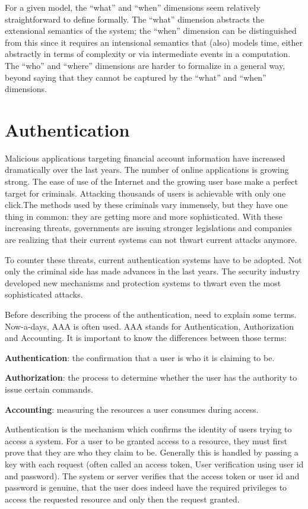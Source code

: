 For a given model, the \enquote{what} and \enquote{when} dimensions seem relatively straightforward to define formally. The \enquote{what} dimension abstracts the extensional semantics
of the system; the \enquote{when} dimension can be distinguished from this since it requires an intensional semantics that (also) models time, either abstractly in terms of complexity
or via intermediate events in a computation. The \enquote{who} and \enquote{where} dimensions are
harder to formalize in a general way, beyond saying that they cannot be captured by the
\enquote{what} and \enquote{when} dimensions.

\section{Authentication}
Malicious applications targeting financial account information have increased dramatically over the last years. The number of online applications is growing strong. The ease of use of the Internet and the growing user base make a perfect target for criminals. Attacking thousands of users is achievable with only one click.The methods used by these criminals vary immensely, but they have one thing in common: they are getting more and more sophisticated. With these increasing threats, governments are issuing stronger legislations and companies are realizing that their current systems can not thwart current attacks anymore.

To counter these threats, current authentication systems have to be adopted. Not only the criminal side has made advances in the last years. The security industry developed new mechanisms and protection systems to thwart even the most sophisticated attacks.

Before describing the process of the authentication, need to explain some terms. Now-a-days, AAA is often used. AAA stands for Authentication, Authorization and Accounting. It is important to know the differences between those terms:
 
\textbf{Authentication}: the confirmation that a user is who it is claiming to be. 

\textbf{Authorization}: the process to determine whether the user has the authority to issue certain commands.
 
\textbf{Accounting}: measuring the resources a user consumes during access.


Authentication is the mechanism which confirms the identity of users trying to access a system. For a user to be granted access to a resource, they must first prove that they are who they claim to be. Generally this is handled by passing a key with each request (often called an access token, User verification using user id and password). The system or server verifies that the access token or user id and password is genuine, that the user does indeed have the required privileges to access the requested resource and only then the request granted.

